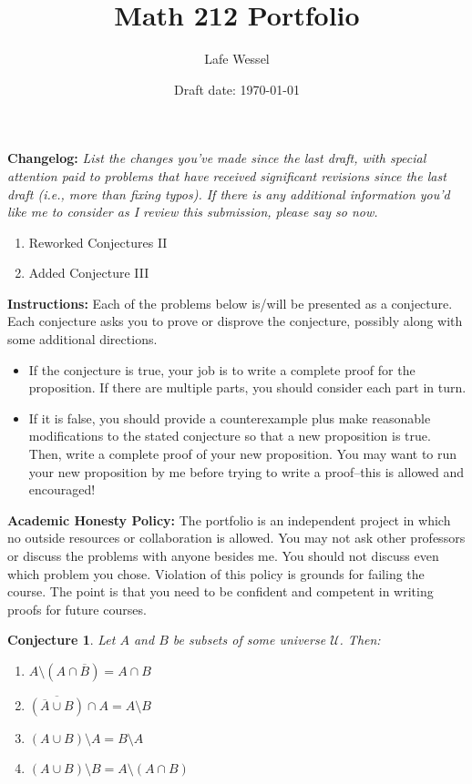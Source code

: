 \documentclass[11pt,titlepage]{article}		%
\title{\sc Math 212 Portfolio}
\author{Lafe Wessel}
\date{Draft date: \today}
\theoremstyle{theorem}
\newtheorem{conjecture}[theorem]{Conjecture}
\begin{document}
\maketitle


\noindent\textbf{Changelog:} \emph{List the changes you've made since the last draft, with special attention paid to problems that have received significant revisions since the last draft (i.e., more than fixing typos). If there is any additional information you'd like me to consider as I review this submission, please say so now.}

\begin{enumerate}
\item Reworked Conjectures II
\item Added Conjecture III
\end{enumerate}

\noindent\textbf{Instructions:} Each of the problems below is/will be presented as a conjecture. Each conjecture asks you to prove or disprove the conjecture, possibly along with some additional directions. 

\bigskip

\begin{itemize}  
	\item If the conjecture is true, your job is to write a complete proof for the proposition. If there are multiple parts, you should consider each part in turn.
	\item If it is false, you should provide a counterexample plus make reasonable modifications to the stated conjecture so that a new proposition is true. Then, write a complete proof of your new proposition. You may want to run your new proposition by me before trying to write a proof--this is allowed and encouraged!
\end{itemize}


\noindent\textbf{Academic Honesty Policy:}
The portfolio is an independent project in which no outside resources or collaboration is allowed. You may not ask other professors or discuss the problems with anyone besides me. You should not discuss even which problem you chose. Violation of this policy is grounds for failing the course. The point is that you need to be confident and competent in writing proofs for future courses.






\clearpage

\begin{conjecture}
	Let $A$ and $B$ be subsets of some universe $\mathcal{U}$.
	Then:
	\begin{enumerate}
		\item $A\setminus (A\cap \overline{B}) = A\cap B$
		\item $\overline{(\overline{A}\cup B)} \cap A = A\setminus B$
		\item $(A\cup B)\setminus A = B\setminus A$
		\item $(A\cup B) \setminus B = A\setminus (A\cap B)$
	\end{enumerate}
\end{conjecture}
\end{document}
